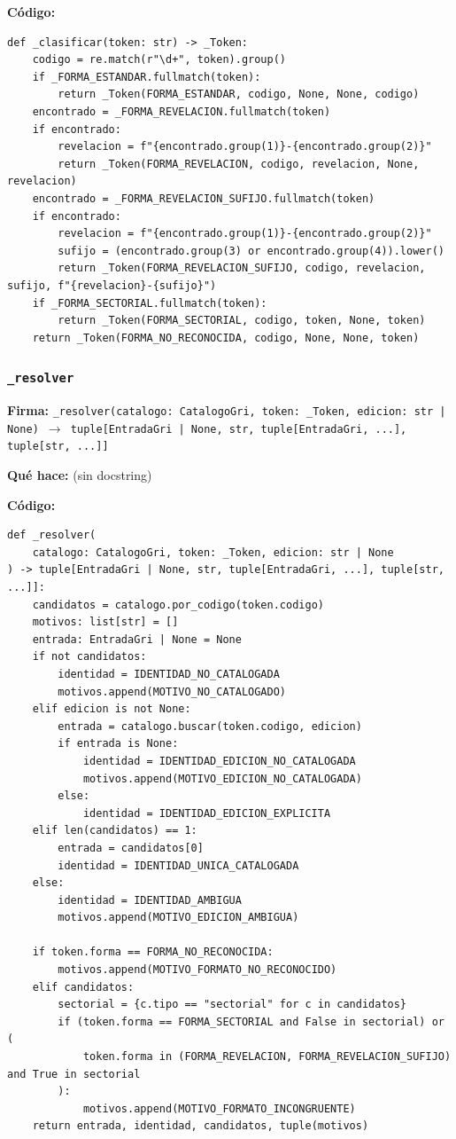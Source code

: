 \documentclass[11pt,a4paper]{article}
\begin{document}
\textbf{Código:}
\begin{lstlisting}
def _clasificar(token: str) -> _Token:
    codigo = re.match(r"\d+", token).group()
    if _FORMA_ESTANDAR.fullmatch(token):
        return _Token(FORMA_ESTANDAR, codigo, None, None, codigo)
    encontrado = _FORMA_REVELACION.fullmatch(token)
    if encontrado:
        revelacion = f"{encontrado.group(1)}-{encontrado.group(2)}"
        return _Token(FORMA_REVELACION, codigo, revelacion, None, revelacion)
    encontrado = _FORMA_REVELACION_SUFIJO.fullmatch(token)
    if encontrado:
        revelacion = f"{encontrado.group(1)}-{encontrado.group(2)}"
        sufijo = (encontrado.group(3) or encontrado.group(4)).lower()
        return _Token(FORMA_REVELACION_SUFIJO, codigo, revelacion, sufijo, f"{revelacion}-{sufijo}")
    if _FORMA_SECTORIAL.fullmatch(token):
        return _Token(FORMA_SECTORIAL, codigo, token, None, token)
    return _Token(FORMA_NO_RECONOCIDA, codigo, None, None, token)
\end{lstlisting}

\subsubsection*{\texttt{\_resolver}}
\textbf{Firma:} \texttt{\_resolver(catalogo: CatalogoGri, token: \_Token, edicion: str | None) $\rightarrow$ tuple[EntradaGri | None, str, tuple[EntradaGri, ...], tuple[str, ...]]}

\textbf{Qué hace:} (sin docstring)

\textbf{Código:}
\begin{lstlisting}
def _resolver(
    catalogo: CatalogoGri, token: _Token, edicion: str | None
) -> tuple[EntradaGri | None, str, tuple[EntradaGri, ...], tuple[str, ...]]:
    candidatos = catalogo.por_codigo(token.codigo)
    motivos: list[str] = []
    entrada: EntradaGri | None = None
    if not candidatos:
        identidad = IDENTIDAD_NO_CATALOGADA
        motivos.append(MOTIVO_NO_CATALOGADO)
    elif edicion is not None:
        entrada = catalogo.buscar(token.codigo, edicion)
        if entrada is None:
            identidad = IDENTIDAD_EDICION_NO_CATALOGADA
            motivos.append(MOTIVO_EDICION_NO_CATALOGADA)
        else:
            identidad = IDENTIDAD_EDICION_EXPLICITA
    elif len(candidatos) == 1:
        entrada = candidatos[0]
        identidad = IDENTIDAD_UNICA_CATALOGADA
    else:
        identidad = IDENTIDAD_AMBIGUA
        motivos.append(MOTIVO_EDICION_AMBIGUA)

    if token.forma == FORMA_NO_RECONOCIDA:
        motivos.append(MOTIVO_FORMATO_NO_RECONOCIDO)
    elif candidatos:
        sectorial = {c.tipo == "sectorial" for c in candidatos}
        if (token.forma == FORMA_SECTORIAL and False in sectorial) or (
            token.forma in (FORMA_REVELACION, FORMA_REVELACION_SUFIJO) and True in sectorial
        ):
            motivos.append(MOTIVO_FORMATO_INCONGRUENTE)
    return entrada, identidad, candidatos, tuple(motivos)
\end{lstlisting}
\end{document}
